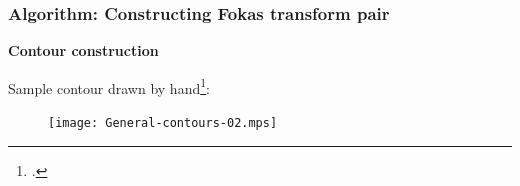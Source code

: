 \documentclass{beamer}
\begin{document}
\begin{frame}[t]
    \frametitle{Algorithm: Constructing Fokas transform pair}
    \textbf{Contour construction}
    
    Sample contour drawn by hand\footcite{Smith2016}:
    \begin{figure}[htpb!]
        \centering
        \texttt{[image: General-contours-02.mps]}
        \label{fig:gamma_smith_fokas}
    \end{figure}
\end{frame}
\end{document}
